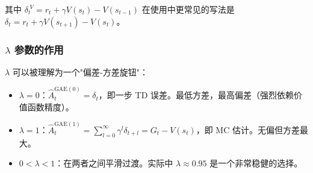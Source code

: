 其中 $\delta_t^{\;V} = r_t + \gamma V(s_t) - V(s_{t-1})$ 在使用中更常见的写法是 $\delta_t = r_t + \gamma V(s_{t+1}) - V(s_t)$。

\subsubsection{$\lambda$ 参数的作用}

$\lambda$ 可以被理解为一个"偏差-方差旋钮"：

\begin{itemize}
    \item \textbf{$\lambda = 0$}：$\hat{A}_t^{\text{GAE}(0)} = \delta_t$，即一步 TD 误差。最低方差，最高偏差（强烈依赖价值函数精度）。
    \item \textbf{$\lambda = 1$}：$\hat{A}_t^{\text{GAE}(1)} = \sum_{l=0}^{\infty} \gamma^l \delta_{t+l} = G_t - V(s_t)$，即 MC 估计。无偏但方差最大。
    \item \textbf{$0 < \lambda < 1$}：在两者之间平滑过渡。实际中 $\lambda \approx 0.95$ 是一个非常稳健的选择。
\end{itemize}

